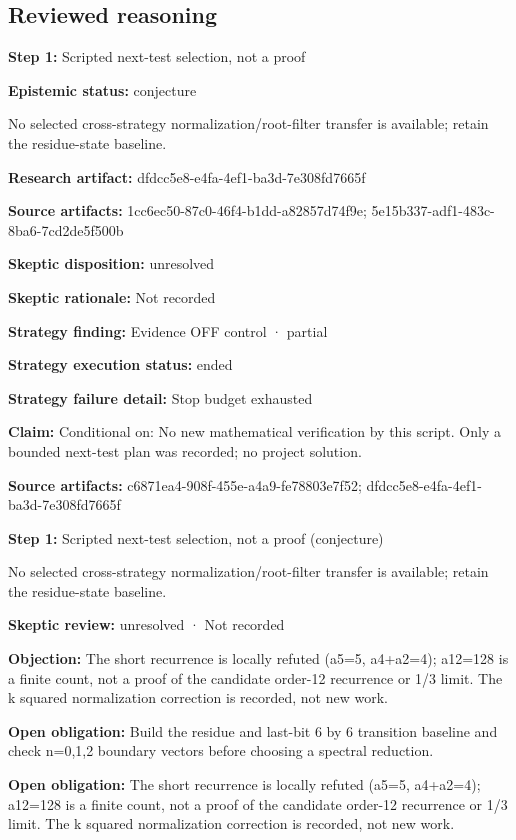 \documentclass[11pt]{article}
\begin{document}
\subsection{Reviewed reasoning}
\textbf{Step 1:} Scripted next-test selection, not a proof\par
\textbf{Epistemic status:} conjecture\par
No selected cross-strategy normalization/root-filter transfer is available; retain the residue-state baseline.\par
\textbf{Research artifact:} dfdcc5e8-e4fa-4ef1-ba3d-7e308fd7665f\par
\textbf{Source artifacts:} 1cc6ec50-87c0-46f4-b1dd-a82857d74f9e; 5e15b337-adf1-483c-8ba6-7cd2de5f500b\par
\textbf{Skeptic disposition:} unresolved\par
\textbf{Skeptic rationale:} Not recorded\par
\textbf{Strategy finding:} Evidence OFF control · partial\par
\textbf{Strategy execution status:} ended\par
\textbf{Strategy failure detail:} Stop budget exhausted\par
\textbf{Claim:} Conditional on: No new mathematical verification by this script. Only a bounded next-test plan was recorded; no project solution.\par
\textbf{Source artifacts:} c6871ea4-908f-455e-a4a9-fe78803e7f52; dfdcc5e8-e4fa-4ef1-ba3d-7e308fd7665f\par
\textbf{Step 1:} Scripted next-test selection, not a proof (conjecture)\par
No selected cross-strategy normalization/root-filter transfer is available; retain the residue-state baseline.\par
\textbf{Skeptic review:} unresolved · Not recorded\par
\textbf{Objection:} The short recurrence is locally refuted (a5=5, a4+a2=4); a12=128 is a finite count, not a proof of the candidate order-12 recurrence or 1/3 limit. The k squared normalization correction is recorded, not new work.\par
\textbf{Open obligation:} Build the residue and last-bit 6 by 6 transition baseline and check n=0,1,2 boundary vectors before choosing a spectral reduction.\par
\textbf{Open obligation:} The short recurrence is locally refuted (a5=5, a4+a2=4); a12=128 is a finite count, not a proof of the candidate order-12 recurrence or 1/3 limit. The k squared normalization correction is recorded, not new work.\par
\end{document}

